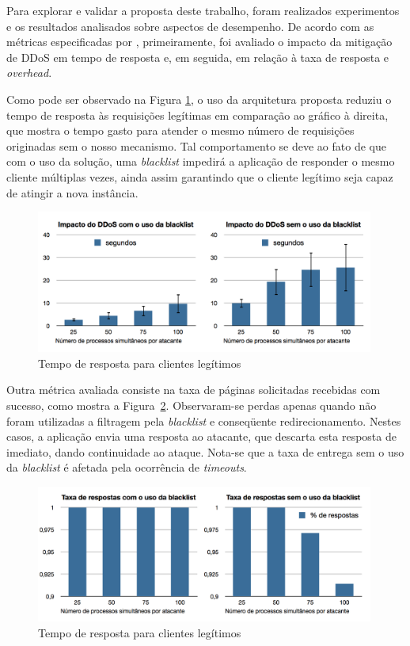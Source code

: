 
Para explorar e validar a proposta deste trabalho, foram realizados experimentos e os resultados analisados sobre aspectos de desempenho. De acordo com as métricas especificadas por \cite{4600003}, primeiramente, foi avaliado o impacto da mitigação de DDoS em tempo de resposta e, em seguida, em relação à taxa de resposta e \emph{overhead}. 

Como pode ser observado na Figura \ref{fig:blacklistSecs}, o uso da arquitetura proposta reduziu o tempo de resposta às requisições legítimas em comparação ao gráfico à direita, que mostra o tempo gasto para atender o mesmo número de requisições originadas sem o nosso mecanismo. Tal comportamento se deve ao fato de que com o uso da solução, uma \emph{blacklist} impedirá a aplicação de responder o mesmo cliente múltiplas vezes, ainda assim garantindo que o cliente legítimo seja capaz de atingir a nova instância.

\begin{figure}[h!]
\centering
\includegraphics[width=0.99\textwidth]{images/blacklistSecs.png}
\caption{Tempo de resposta para clientes legítimos}
\label{fig:blacklistSecs}
\end{figure}




Outra métrica avaliada consiste na taxa de páginas solicitadas recebidas com sucesso, como mostra a Figura~\ref{fig:blacklistTxResp}. Observaram-se  perdas apenas quando não foram utilizadas a filtragem pela \emph{blacklist} e conseqüente redirecionamento. Nestes casos, a aplicação envia uma resposta ao atacante, que descarta esta resposta de imediato, dando continuidade ao ataque. Nota-se que a taxa de entrega sem o uso da \emph{blacklist} é afetada pela ocorrência de \emph{timeouts}.


\begin{figure}[h!]
\centering
\includegraphics[width=0.99\textwidth]{images/blacklistTxResp.png}
\caption{Tempo de resposta para clientes legítimos}
\label{fig:blacklistTxResp}
\end{figure}

